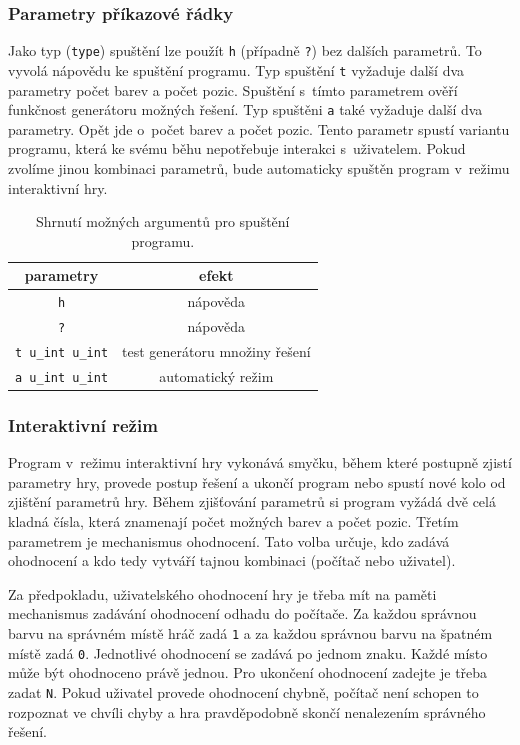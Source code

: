 \documentclass[12pt, a4paper]{article}
\begin{document}
\subsubsection{Parametry příkazové řádky}
Jako typ (\texttt{type}) spuštění lze použít \texttt{h} (případně \texttt{?}) bez dalších parametrů. To vyvolá nápovědu ke spuštění programu. Typ spuštění \texttt{t} vyžaduje další dva parametry počet barev a počet pozic. Spuštění s~tímto parametrem ověří funkčnost generátoru možných řešení. Typ spuštěni \texttt{a} také vyžaduje další dva parametry. Opět jde o~počet barev a počet pozic. Tento parametr spustí variantu programu, která ke svému běhu nepotřebuje interakci s~uživatelem. Pokud zvolíme jinou kombinaci parametrů, bude automaticky spuštěn program v~režimu interaktivní hry.

\begin{table}[htb]
	\centering
	\begin{tabular}{c | c}
		parametry & efekt\\
		\hline
		\texttt{h} & nápověda\\
		\texttt{?} & nápověda\\
		\texttt{t u\_int u\_int} & test generátoru množiny řešení\\
		\texttt{a u\_int u\_int} & automatický režim
	\end{tabular}     

	\caption{Shrnutí možných argumentů pro spuštění programu.}
	\label{tab:args}
\end{table}

\subsubsection{Interaktivní režim}

Program v~režimu interaktivní hry vykonává smyčku, během které postupně zjistí parametry hry, provede postup řešení a ukončí program nebo spustí nové kolo od zjištění parametrů hry. Během zjišťování parametrů si program vyžádá dvě celá kladná čísla, která znamenají počet možných barev a počet pozic. Třetím parametrem je mechanismus ohodnocení. Tato volba určuje, kdo zadává ohodnocení a kdo tedy vytváří tajnou kombinaci (počítač nebo uživatel). 

Za předpokladu, uživatelského ohodnocení hry je třeba mít na paměti mechanismus zadávání ohodnocení odhadu do počítače. Za každou správnou barvu na správném místě hráč zadá \texttt{1} a za každou správnou barvu na špatném místě zadá \texttt{0}. Jednotlivé ohodnocení se zadává po jednom znaku. Každé místo může být ohodnoceno právě jednou. Pro ukončení ohodnocení zadejte je třeba zadat \texttt{N}. Pokud uživatel provede ohodnocení chybně, počítač není schopen to rozpoznat ve chvíli chyby a hra pravděpodobně skončí nenalezením správného řešení.  
\end{document}
